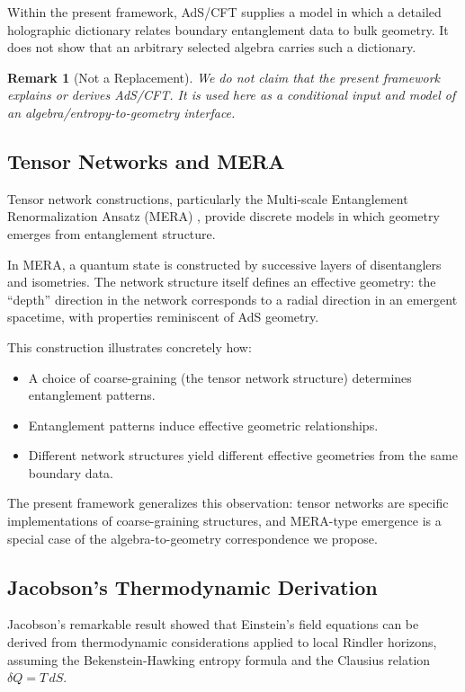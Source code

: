 \documentclass[12pt,a4paper,openany]{book}
\newtheorem{remark}[theorem]{Remark}
\begin{document}
Within the present framework, AdS/CFT supplies a model in which a detailed holographic dictionary relates boundary entanglement data to bulk geometry.  It does not show that an arbitrary selected algebra carries such a dictionary.

\begin{remark}[Not a Replacement]
We do not claim that the present framework explains or derives AdS/CFT.  It is used here as a conditional input and model of an algebra/entropy-to-geometry interface.
\end{remark}

\subsection{Tensor Networks and MERA}

Tensor network constructions, particularly the Multi-scale Entanglement Renormalization Ansatz (MERA) \cite{Vidal2008,Swingle2012}, provide discrete models in which geometry emerges from entanglement structure.

In MERA, a quantum state is constructed by successive layers of disentanglers and isometries. The network structure itself defines an effective geometry: the ``depth'' direction in the network corresponds to a radial direction in an emergent spacetime, with properties reminiscent of AdS geometry.

This construction illustrates concretely how:
\begin{itemize}
    \item A choice of coarse-graining (the tensor network structure) determines entanglement patterns.
    \item Entanglement patterns induce effective geometric relationships.
    \item Different network structures yield different effective geometries from the same boundary data.
\end{itemize}

The present framework generalizes this observation: tensor networks are specific implementations of coarse-graining structures, and MERA-type emergence is a special case of the algebra-to-geometry correspondence we propose.

\subsection{Jacobson's Thermodynamic Derivation}

Jacobson's remarkable result \cite{Jacobson1995} showed that Einstein's field equations can be derived from thermodynamic considerations applied to local Rindler horizons, assuming the Bekenstein-Hawking entropy formula and the Clausius relation $\delta Q = T \, dS$.
\end{document}

